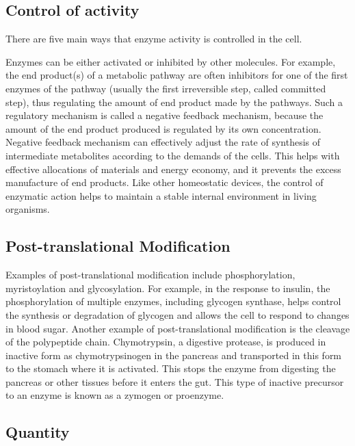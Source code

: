 \hypertarget{control-of-activity}{%
\subsection{Control of activity}\label{control-of-activity}}

There are five main ways that enzyme activity is controlled in the cell.

Enzymes can be either activated or inhibited by other molecules. For example, the end product(s) of a metabolic pathway are often inhibitors for one of the first enzymes of the pathway (usually the first irreversible step, called committed step), thus regulating the amount of end product made by the pathways. Such a regulatory mechanism is called a negative feedback mechanism, because the amount of the end product produced is regulated by its own concentration. Negative feedback mechanism can effectively adjust the rate of synthesis of intermediate metabolites according to the demands of the cells. This helps with effective allocations of materials and energy economy, and it prevents the excess manufacture of end products. Like other homeostatic devices, the control of enzymatic action helps to maintain a stable internal environment in living organisms.

\hypertarget{post-translational-modification}{%
\subsection{Post-translational Modification}\label{post-translational-modification}}

Examples of post-translational modification include phosphorylation, myristoylation and glycosylation. For example, in the response to insulin, the phosphorylation of multiple enzymes, including glycogen synthase, helps control the synthesis or degradation of glycogen and allows the cell to respond to changes in blood sugar. Another example of post-translational modification is the cleavage of the polypeptide chain. Chymotrypsin, a digestive protease, is produced in inactive form as chymotrypsinogen in the pancreas and transported in this form to the stomach where it is activated. This stops the enzyme from digesting the pancreas or other tissues before it enters the gut. This type of inactive precursor to an enzyme is known as a zymogen or proenzyme.

\hypertarget{quantity}{%
\subsection{Quantity}\label{quantity}}

